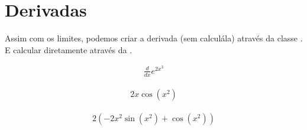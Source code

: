 \documentclass[letterpaper,10pt,english]{jupyterBook}
\begin{document}
\section{Derivadas}
\label{\detokenize{chapters/4:derivadas}}
\sphinxAtStartPar
Assim com os limites, podemos criar a derivada (sem calculá\sphinxhyphen{}la) através da classe . E calcular diretamente através da .

\begin{sphinxVerbatim}[commandchars=\\\{\}]
\end{sphinxVerbatim}
\begin{equation*}
\begin{split}\displaystyle \frac{d}{d x} e^{2 x^{3}}\end{split}
\end{equation*}
\begin{sphinxVerbatim}[commandchars=\\\{\}]
\end{sphinxVerbatim}
\begin{equation*}
\begin{split}\displaystyle 2 x \cos{\left(x^{2} \right)}\end{split}
\end{equation*}
\begin{sphinxVerbatim}[commandchars=\\\{\}]
  
\end{sphinxVerbatim}
\begin{equation*}
\begin{split}\displaystyle 2 \left(- 2 x^{2} \sin{\left(x^{2} \right)} + \cos{\left(x^{2} \right)}\right)\end{split}
\end{equation*}
\begin{sphinxVerbatim}[commandchars=\\\{\}]
   
\end{sphinxVerbatim}
\end{document}
